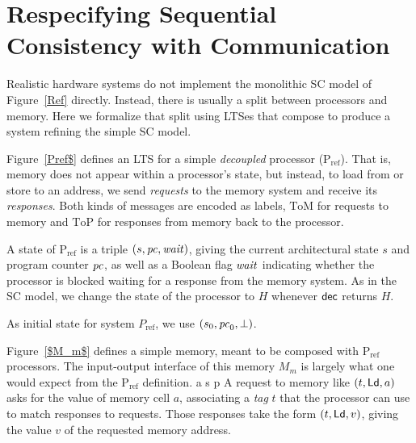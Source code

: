 \section{Respecifying Sequential Consistency with Communication}\label{sec:ref}

Realistic hardware systems do not implement the monolithic SC model of
Figure~\ref{Ref} directly.  Instead, there is usually a split between
processors and memory. Here we formalize that split using LTSes that 
compose to produce a system refining the simple SC model.

Figure~\ref{Pref$} defines an LTS for a simple \emph{decoupled} processor
(P$_\text{ref}$).  That is, memory does not appear within a processor's state, but
instead, to load from or store to an address, we send \emph{requests} to the
memory system and receive its \emph{responses}.  Both kinds of messages are
encoded as labels, $\text{ToM}$ for requests to memory and $\text{ToP}$ for
responses from memory back to the processor.

A state of P$_{\text{ref}}$ is a triple $(s, \mathit{pc}, \mathit{wait})$, giving the current architectural
state $s$ and program counter $\mathit{pc}$, as well as a Boolean flag $\mathit{wait}$
indicating whether the processor is blocked waiting for a response from the
memory system. As in the SC model, we change the state of the processor to $H$
whenever $\mathsf{dec}$ returns $H$. 

As initial state for system $P_\text{ref}$, we use $(s_0, \mathit{pc}_0, \bot)$.


Figure~\ref{$M_m$} defines a simple memory, meant to be composed with P$_{\text{ref}}$
processors.  The input-output interface of this memory $M_m$ is largely what
one would expect from the P$_{\text{ref}}$ definition. 
a%
s%
p%
A request to memory like $(t, \mathsf{Ld}, a)$ asks
for the value of memory cell $a$, associating a \emph{tag} $t$ that the
processor can use to match responses to requests.  Those responses take the
form $(t, \mathsf{Ld}, v)$, giving the value $v$ of the requested memory address.

